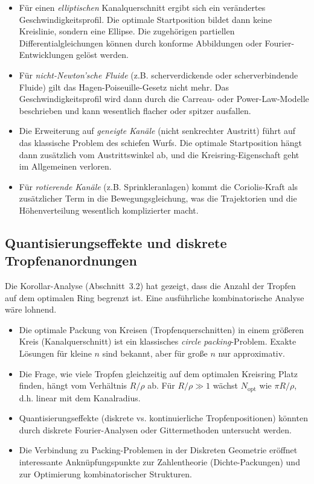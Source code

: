 ﻿\documentclass[a4paper,12pt]{article}
\theoremstyle{definition}
\begin{document}
\begin{itemize}
    \item Für einen \emph{elliptischen} Kanalquerschnitt ergibt sich ein verändertes
          Geschwindigkeitsprofil. Die optimale Startposition bildet dann keine Kreislinie,
          sondern eine Ellipse. Die zugehörigen partiellen Differentialgleichungen können
          durch konforme Abbildungen oder Fourier-Entwicklungen gelöst werden.
    \item Für \emph{nicht-Newton'sche Fluide} (z.B. scherverdickende oder scherverbindende
          Fluide) gilt das Hagen-Poiseuille-Gesetz nicht mehr. Das Geschwindigkeitsprofil
          wird dann durch die Carreau- oder Power-Law-Modelle beschrieben und kann
          wesentlich flacher oder spitzer ausfallen.
    \item Die Erweiterung auf \emph{geneigte Kanäle} (nicht senkrechter Austritt) führt
          auf das klassische Problem des schiefen Wurfs. Die optimale Startposition hängt
          dann zusätzlich vom Austrittswinkel ab, und die Kreisring-Eigenschaft geht
          im Allgemeinen verloren.
    \item Für \emph{rotierende Kanäle} (z.B. Sprinkleranlagen) kommt die Coriolis-Kraft
          als zusätzlicher Term in die Bewegungsgleichung, was die Trajektorien und die
          Höhenverteilung wesentlich komplizierter macht.
\end{itemize}

\subsection{Quantisierungseffekte und diskrete Tropfenanordnungen}

Die Korollar-Analyse (Abschnitt~3.2) hat gezeigt, dass die Anzahl der Tropfen auf dem
optimalen Ring begrenzt ist. Eine ausführliche kombinatorische Analyse wäre lohnend.

\begin{itemize}
    \item Die optimale Packung von Kreisen (Tropfenquerschnitten) in einem größeren Kreis
          (Kanalquerschnitt) ist ein klassisches \emph{circle packing}-Problem.
          Exakte Lösungen für kleine $n$ sind bekannt, aber für große $n$ nur approximativ.
    \item Die Frage, wie viele Tropfen gleichzeitig auf dem optimalen Kreisring Platz finden,
          hängt vom Verhältnis $R/\rho$ ab. Für $R/\rho \gg 1$ wächst $N_{\text{opt}}$
          wie $\pi R / \rho$, d.h. linear mit dem Kanalradius.
    \item Quantisierungseffekte (diskrete vs. kontinuierliche Tropfenpositionen) könnten
          durch diskrete Fourier-Analysen oder Gittermethoden untersucht werden.
    \item Die Verbindung zu Packing-Problemen in der Diskreten Geometrie eröffnet
          interessante Anknüpfungspunkte zur Zahlentheorie (Dichte-Packungen) und zur
          Optimierung kombinatorischer Strukturen.
\end{itemize}
\end{document}
